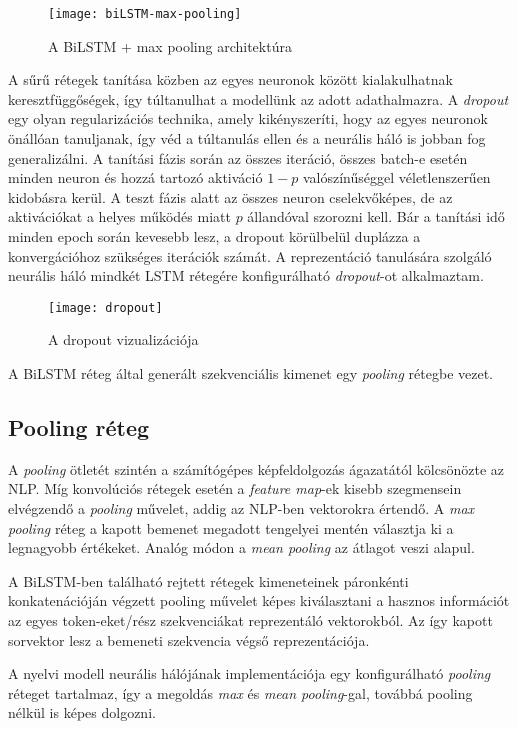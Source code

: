 \begin{figure}[H]
	\centering
	\texttt{[image: biLSTM-max-pooling]}
	\caption{A BiLSTM + max pooling architektúra}
\end{figure}

A sűrű rétegek tanítása közben az egyes neuronok között kialakulhatnak keresztfüggőségek, így túltanulhat a modellünk az adott adathalmazra. A \textit{dropout} egy olyan regularizációs technika, amely kikényszeríti, hogy az egyes neuronok önállóan tanuljanak, így véd a túltanulás ellen és a neurális háló is jobban fog generalizálni. A tanítási fázis során az összes iteráció, összes batch-e esetén minden neuron és hozzá tartozó aktiváció $1-p$ valószínűséggel véletlenszerűen kidobásra kerül. A teszt fázis alatt az összes neuron cselekvőképes, de az aktivációkat a helyes működés miatt $p$ állandóval szorozni kell. Bár a tanítási idő minden epoch során kevesebb lesz, a dropout körülbelül duplázza a konvergációhoz szükséges iterációk számát. A reprezentáció tanulására szolgáló neurális háló mindkét LSTM rétegére konfigurálható \textit{dropout}-ot alkalmaztam.

\begin{figure}[H]
	\centering
	\texttt{[image: dropout]}
	\caption{A dropout vizualizációja}
\end{figure}

A BiLSTM réteg által generált szekvenciális kimenet egy \textit{pooling} rétegbe vezet.

\subsection{Pooling réteg}

A \textit{pooling} ötletét szintén a számítógépes képfeldolgozás ágazatától kölcsönözte az NLP. Míg konvolúciós rétegek esetén a \textit{feature map}-ek kisebb szegmensein elvégzendő a \textit{pooling} művelet, addig az NLP-ben vektorokra értendő.
A \textit{max pooling} réteg a kapott bemenet megadott tengelyei mentén választja ki a legnagyobb értékeket. Analóg módon a \textit{mean pooling} az átlagot veszi alapul.

A BiLSTM-ben található rejtett rétegek kimeneteinek páronkénti konkatenációján végzett pooling művelet képes kiválasztani a hasznos információt az egyes token-eket/rész szekvenciákat reprezentáló vektorokból. Az így kapott sorvektor lesz a bemeneti szekvencia végső reprezentációja.

A nyelvi modell neurális hálójának implementációja egy konfigurálható \textit{pooling} réteget tartalmaz, így a megoldás \textit{max} és \textit{mean pooling}-gal, továbbá pooling nélkül is képes dolgozni.

